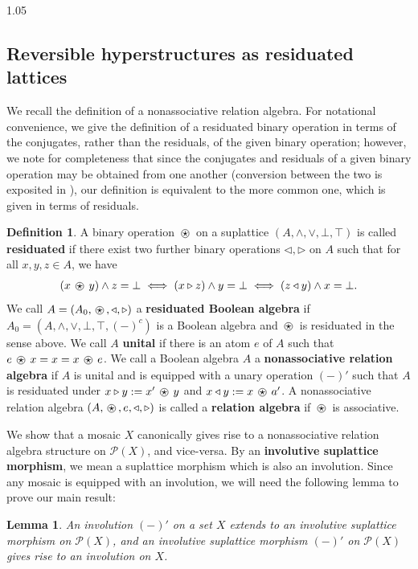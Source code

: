 \documentclass[reqno]{amsart}
\newcommand{\ostar}{%
  \mathbin{%
    \tikz[baseline=(s.base)]{
      \node (s) at (0,0) {$\star$};
      \draw[line width=0.4pt] (s.center) circle[radius=0.82ex];
    }%
  }%
}
\newcommand{\pow}{\mathcal{P}}
\numberwithin{equation}{section}
\theoremstyle{plain}
\newtheorem{lemma}[equation]{Lemma}
\theoremstyle{definition}
\newtheorem{definition}[equation]{Definition}
\begin{document}
\begin{spacing}{1.05}
\subsection{Reversible hyperstructures as residuated lattices}

We recall the definition of a nonassociative relation algebra. For notational convenience, we give the definition of a residuated binary operation in terms of the conjugates, rather than the residuals, of the given binary operation; however, we note for completeness that since the conjugates and residuals of a given binary operation may be obtained from one another (conversion between the two is exposited in \cite{Jonsson_Tsinakis_1993}), our definition is equivalent to the more common one, which is given in terms of residuals.

\begin{definition} \cite{Jonsson_Tsinakis_1993}
    A binary operation $\ostar$ on a suplattice $(A, \land, \lor, \bot, \top)$ is called \textbf{residuated} if there exist two further binary operations $\triangleleft, \triangleright$ on $A$ such that for all $x,y,z \in A$, we have $$ (x \ostar y) \land z = \bot \iff (x \triangleright z) \land y = \bot \iff (z \triangleleft y) \land x = \bot.$$ We call $A = (A_0,\ostar, \triangleleft, \triangleright)$ a \textbf{residuated Boolean algebra} if $A_0 = (A, \land, \lor, \bot, \top, (-)^c)$ is a Boolean algebra and $\ostar$ is residuated in the sense above. We call $A$ \textbf{unital} if there is an atom $e$ of $A$ such that $e \ostar x = x = x \ostar e$. We call a Boolean algebra $A$ a \textbf{nonassociative relation algebra} if $A$ is unital and is equipped with a unary operation $(-)'$ such that $A$ is residuated under $x \triangleright y := x' \ostar y$ and $x \triangleleft y := x \ostar a'$. A nonassociative relation algebra $(A, \ostar, e, \triangleleft, \triangleright)$ is called a \textbf{relation algebra} if $\ostar$ is associative.
\end{definition}

We show that a mosaic $X$ canonically gives rise to a nonassociative relation algebra structure on $\pow(X)$, and vice-versa. By an \textbf{involutive suplattice morphism}, we mean a suplattice morphism which is also an involution. Since any mosaic is equipped with an involution, we will need the following lemma to prove our main result:

\begin{lemma} \label{lem:involution-to-involution} An involution $(-)'$ on a set $X$ extends to an involutive suplattice morphism on $\pow(X)$, and an involutive suplattice morphism $(-)'$ on $\pow(X)$ gives rise to an involution on $X$.
\end{lemma}


\end{spacing}
\end{document}
